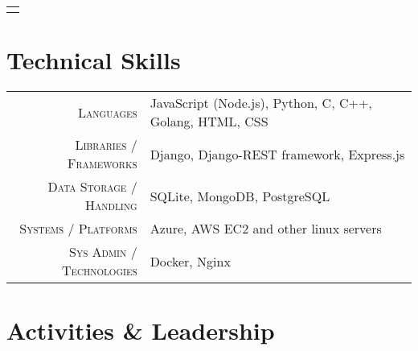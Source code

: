 \documentclass[a4paper,10pt]{extarticle} %
\begin{document}
\begin{tabular}{p{19.7cm}}
{\begin{description}[style=nextline, font=$\bullet$\hspace{2mm}\normalsize]
\end{description}
\end{tabular}

\vspace{0.2cm}
\section{\textcolor{primary}{Technical Skills}}
\vspace{0.2cm}

\begin{tabular}{r|p{15cm}}
\textsc{Languages} & JavaScript (Node.js), Python, C, C++, Golang, HTML, CSS \\
\textsc{Libraries / Frameworks} & Django, Django-REST framework, Express.js \\
\textsc{Data Storage / Handling} & SQLite, MongoDB, PostgreSQL \\
\textsc{Systems / Platforms} & Azure, AWS EC2 and other linux servers \\
\textsc{Sys Admin / Technologies} & Docker, Nginx\\

\end{tabular}


\vspace{0.4cm}
\section{\textcolor{primary}{Activities \& Leadership}}
\end{document}

